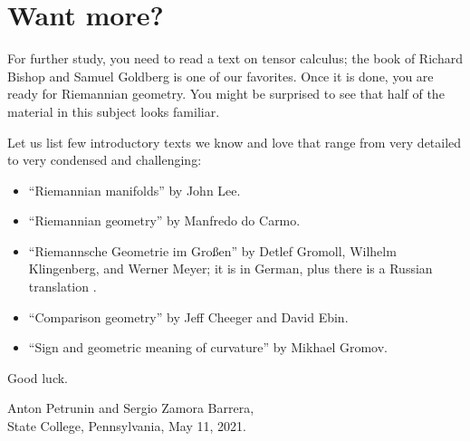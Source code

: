 \chapter*{Want more?}

For further study, you need to read a text on tensor calculus;
the book of Richard Bishop and Samuel Goldberg \cite{bishop-goldberg} is one of our favorites.
Once it is done, you are ready for Riemannian geometry.
You might be surprised to see that half of the material in this subject looks familiar.

Let us list few introductory texts we know and love that range from very detailed to very condensed and challenging:
\begin{itemize}
\item ``Riemannian manifolds''  \cite{lee2006riemannian} by John Lee.
\item ``Riemannian geometry'' \cite{carmo1992riemannian} by Manfredo do Carmo.
\item ``Riemannsche Geometrie im Großen'' \cite{gromoll-klingenberg-meyer} by 
Detlef Gromoll,
Wilhelm Klingenberg, 
and  Werner Meyer; it is in German, plus there is a Russian translation \cite{gromoll-klingenberg-meyer-ru}.
\item ``Comparison geometry'' \cite{cheeger-ebin} by Jeff Cheeger and David Ebin. 
\item ``Sign and geometric meaning of curvature'' \cite{gromov-1991} by Mikhael Gromov.
\end{itemize}
Good luck.

\begin{flushright}
Anton Petrunin and Sergio Zamora Barrera,\\
State College, Pennsylvania, May 11, 2021.
\end{flushright}
